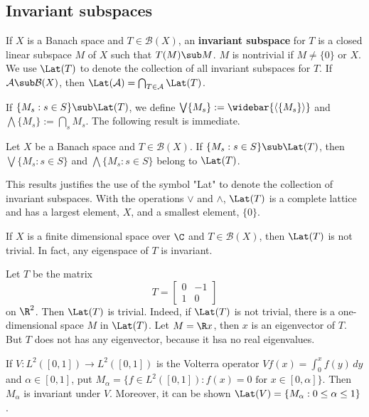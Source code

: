 \subsection{Invariant subspaces}
\begin{definition}
If $X$ is a Banach space and $T\in\mathcal{B}(X)$, an \textbf{invariant subspace} for $T$ is a closed linear subspace $M$ of $X$ such that $T(M)\sub M$. $M$ is nontrivial if $M\neq\{0\}$ or $X$. We use $\Lat(T)$ to denote the collection of all invariant subspaces for $T$. If $\mathcal{A}\sub\mathcal{B}(X)$, then $\Lat(\mathcal{A})=\bigcap_{T\in\mathcal{A}}\Lat(T)$.
\end{definition}
If $\{M_s:s\in S\}\sub\Lat(T)$, we define $\bigvee\{M_s\}:=\widebar{\langle\{M_s\}\rangle}$ and $\bigwedge\{M_s\}:=\bigcap_sM_s$. The following result is immediate. 
\begin{proposition}\label{Banach space invariant subspace prop}
Let $X$ be a Banach space and $T\in\mathcal{B}(X)$. If $\{M_s:s\in S\}\sub\Lat(T)$, then $\bigvee\{M_s:s\in S\}$ and $\bigwedge\{M_s:s\in S\}$ belong to $\Lat(T)$.
\end{proposition}
This results justifies the use of the symbol "Lat" to denote the collection of invariant subspaces. With the operations $\vee$ and $\wedge$, $\Lat(T)$ is a complete lattice and has a largest element, $X$, and a smallest element, $\{0\}$.
\begin{example}
If $X$ is a finite dimensional space over $\C$ and $T\in\mathcal{B}(X)$, then $\Lat(T)$ is not trivial. In fact, any eigenspace of $T$ is invariant.
\end{example}
\begin{example}
Let $T$ be the matrix
\[T=\begin{bmatrix}
0&-1\\
1&0
\end{bmatrix}\]
on $\R^2$. Then $\Lat(T)$ is trivial. Indeed, if $\Lat(T)$ is not trivial, there is a one-dimensional space $M$ in $\Lat(T)$. Let $M=\R x$, then $x$ is an eigenvector of $T$. But $T$ does not has any eigenvector, because it hsa no real eigenvalues.
\end{example}
\begin{example}
If $V:L^2([0,1])\to L^2([0,1])$ is the Volterra operator $Vf(x)=\int_0^xf(y)\,dy$ and $\alpha\in[0,1]$, put $M_\alpha=\{f\in L^2([0,1]):f(x)=0\text{ for $x\in[0,\alpha]$}\}$. Then $M_\alpha$ is invariant under $V$. Moreover, it can be shown $\Lat(V)=\{M_\alpha:0\leq\alpha\leq 1\}$.
\end{example}
